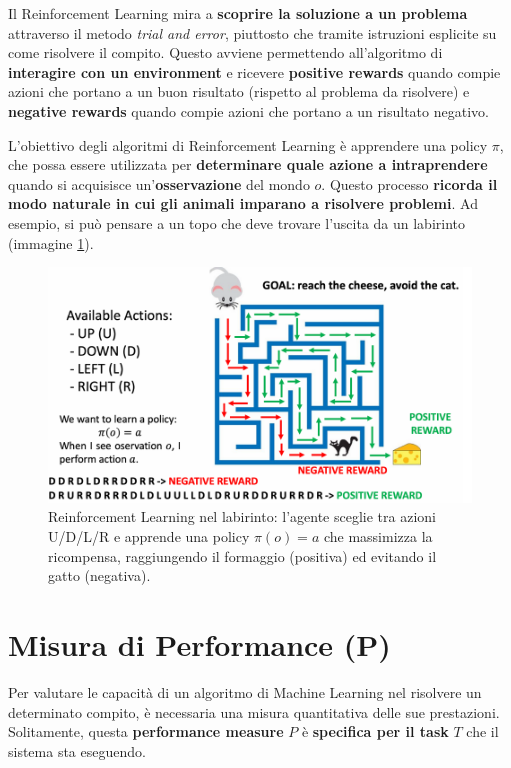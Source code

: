 Il Reinforcement Learning mira a \textbf{scoprire la soluzione a un problema} attraverso il metodo \emph{trial and error}, piuttosto che tramite istruzioni esplicite su come risolvere il compito. Questo avviene permettendo all'algoritmo di \textbf{interagire con un environment} e ricevere \textbf{positive rewards} quando compie azioni che portano a un buon risultato (rispetto al problema da risolvere) e \textbf{negative rewards} quando compie azioni che portano a un risultato negativo.

L'obiettivo degli algoritmi di Reinforcement Learning è apprendere una policy $\pi$, che possa essere utilizzata per \textbf{determinare quale azione a intraprendere} quando si acquisisce un'\textbf{osservazione} del mondo $o$. Questo processo \textbf{ricorda il modo naturale in cui gli animali imparano a risolvere problemi}. Ad esempio, si può pensare a un topo che deve trovare l'uscita da un labirinto (immagine \ref{fig:reinforcementLearning}).

\begin{figure}[htp]
    \centering
    \includegraphics[width=\textwidth]{images/reinforcementLearning.png}
    \caption{Reinforcement Learning nel labirinto: l’agente sceglie tra azioni U/D/L/R e apprende una policy \(\pi(o)=a\) che massimizza la ricompensa, raggiungendo il formaggio (positiva) ed evitando il gatto (negativa).}
\label{fig:reinforcementLearning}
\end{figure}

\section{Misura di Performance (P)}

Per valutare le capacità di un algoritmo di Machine Learning nel risolvere un determinato compito, è necessaria una misura quantitativa delle sue prestazioni. Solitamente, questa \textbf{performance measure} \( P \) è \textbf{specifica per il task} \( T \) che il sistema sta eseguendo.

